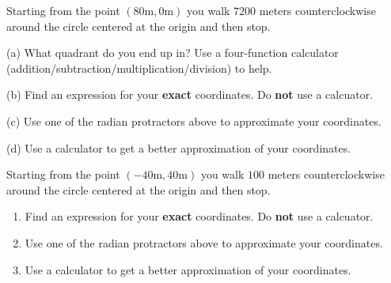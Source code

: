 \documentclass{ximera}
\begin{document}
\begin{question}  \label{Qbast5r:Cosine}
Starting from the point $(80 \text{m},0 \text{m})$ you walk $7200$ meters counterclockwise around the circle centered at the origin and then stop.

(a) What quadrant do you end up in? Use a four-function calculator (addition/subtraction/multiplication/division) to help.

(b) Find an expression for your {\bf exact} coordinates. Do {\bf not} use a calcuator.

(c) Use one of the radian protractors above to approximate your coordinates.

(d) Use a calculator to get a better approximation of your coordinates.

\end{question}


\begin{question}  \label{QLDKRMERdee}
Starting from the point $(-40 \text{m},40\text{m})$ you walk $100$ meters counterclockwise around the circle centered at the origin and then stop.

\begin{enumerate}

\item Find an expression for your {\bf exact} coordinates. Do {\bf not} use a calcuator.

\item Use one of the radian protractors above to approximate your coordinates.

\item Use a calculator to get a better approximation of your coordinates.

\end{enumerate}
\end{question}
\end{document}
